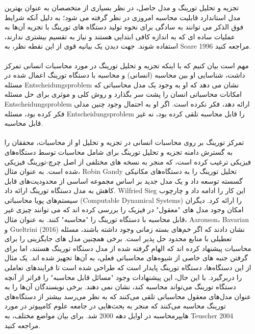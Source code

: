 \documentclass[10pt,a4paper]{article}
\begin{document}
تجزیه و تحلیل تورینگ و مدل حاصل، در نظر بسیاری از متخصصان به عنوان بهترین مدل استاندارد قابلیت محاسبه امروزی در نظر گرفته می شود؛ به دلیل آنکه شرایط فوق الذکر می توانند به سادگی برای نحوه تولید دستگاه های تورینگ با تجزیه آن‌ها به عملیات ساده ای که به اندازه کافی ابتدایی هستند و نیاز به تقسیم بیشتری ندارند، استفاده شوند. جهت دیدن یک بیانیه قوی از این نقطه نظر، به Soare 1996 مراجعه کنید.
                \\
                \\
مهم است بیان کنیم که با اینکه تجزیه و تحلیل تورینگ در مورد محاسبات انسانی تمرکز داشت، شناسایی او بین محاسبه (انسانی) و محاسبه با دستگاه تورینگ اعمال شده در مسئله Entscheidungsproblem نشان می دهد که او به وجود یک مدل محاسباتی که امکانات محاسباتی انسان را پشت سر بگذارد و روش کلی و موثری برای حل مسئله Entscheidungsproblem ارائه دهد، فکر نکرده است. اگر او به احتمال وجود چنین مدلی فکر کرده بود، مسئله Entscheidungsproblem را قابل محاسبه تلقی کرده بود، نه غیر قابل محاسبه.
                \\
                \\تمرکز تورینگ بر روی محاسبات انسانی در تجزیه و تحلیل او از محاسبات، محققان را به گسترش دامنه تجزیه و تحلیل تورینگ برای شامل محاسبات توسط دستگاه‌های فیزیکی ترغیب کرده است، که منجر به نسخه های مختلفی از اصل چرچ-تورینگ فیزیکی شده است. به عنوان مثال، Robin Gandy تحلیل تورینگ را به دستگاه‌های مکانیکی گسسته توسعه داد و یک مدل جدید بر اساس مجموعه اساسی از محدودیت‌های قابل کاهش به مدل دستگاه تورینگ ارائه داد. Wilfried Sieg این کار را ادامه داد و چارچوب سیستم‌های پویا محاسباتی (Computable Dynamical Systems) را ارائه کرد. دیگران امکان وجود مدل های "معقول" در فیزیک را بررسی کرده اند که می توانند چیزی غیر قابل محاسبه با دستگاه تورینگ را "محاسبه" کنند. به عنوان مثال، Aaronson، Bavarian و Gueltrini (2016) نشان دادند که اگر خم‌های بسته زمانی وجود داشته باشند، مسئله تعطیلی با منابع محدود حل پذیر است. برخی همچنین مدل های جایگزینی را برای محاسبات پیشنهاد کرده اند که الهام گرفته شده از مدل دستگاه تورینگ هستند، اما برای گرفتن جنبه های خاصی از شیوه‌های محاسباتی فعلی، به آن‌ها تجهیز شده اند. یک مثال از این دستگاه‌ها، دستگاه تورینگ پایدار است که طراحی شده است تا فرایندهای تعاملی را دربرگیرد. با این حال، این پیشنهادات وجود "مسائل قابل محاسبه" را فراتر از آنچه دستگاه تورینگ می‌تواند محاسبه کند، نشان نمی دهند. برخی نویسندگان آن‌ها را به عنوان مدل‌های معقول محاسباتی تلقی می‌کنند که به نظر می‌رسد بیشتر از دستگاه‌های تورینگ محاسبه می‌کنند که منجر به بحث‌هایی در جامعه علوم کامپیوتر در مورد هایپرمحاسبه در اوایل دهه 2000 شد. برای بیان مواضع مختلف، به Teuscher 2004 مراجعه کنید.\cite{sep-turing-machine}
\end{document}
